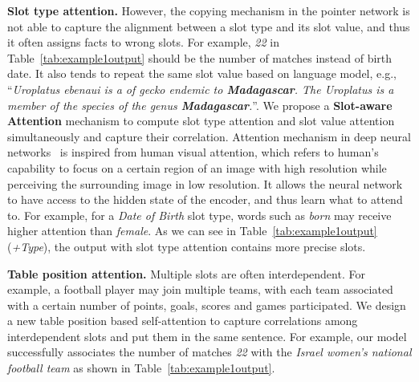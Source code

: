 \documentclass[11pt,a4paper]{article}
\begin{document}
\textbf{Slot type attention.} However, the copying mechanism in the pointer network is not able to capture the alignment between a slot type and its slot value, and thus it often assigns facts to wrong slots. For example, \emph{22} in Table~\ref{tab:example1output} should be the number of matches instead of birth date. It also tends to repeat the same slot value based on language model, e.g.,  ``\textit{Uroplatus ebenaui is a of gecko endemic to \textbf{Madagascar}. The Uroplatus is a member of the species of the genus \textbf{Madagascar}.}''. We propose a \textbf{Slot-aware Attention} mechanism to compute slot type attention and slot value attention simultaneously and capture their correlation. Attention mechanism in deep neural networks~\cite{Denil2012} is inspired from human visual attention, which refers to human's capability to focus on a certain region of an image with high resolution while perceiving the surrounding image in low resolution. It allows the neural network to have access to the hidden state of the encoder, and thus learn what to attend to. For example, for a \emph{Date of Birth} slot type, words such as \emph{born} may receive higher attention than \emph{female}. 
As we can see in Table~\ref{tab:example1output} (\textit{+Type}), the output with slot type attention contains more precise slots. 

























\textbf{Table position attention.} Multiple slots are often interdependent. For example, a football player may join multiple teams, with each team associated with a certain number of points, goals, scores and games participated. We design a new table position based self-attention to capture correlations among interdependent slots and put them in the same sentence. For example, our model successfully associates the number of matches \textit{22} with the \textit{Israel women's national football team} as shown in Table~\ref{tab:example1output}.
\end{document}
